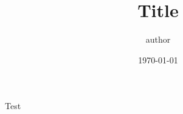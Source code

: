 \documentclass[a4,danish]{article}
\title{Title}
\author{author}
\date{\today}
\begin{document}
\maketitle

Test
\end{document}
